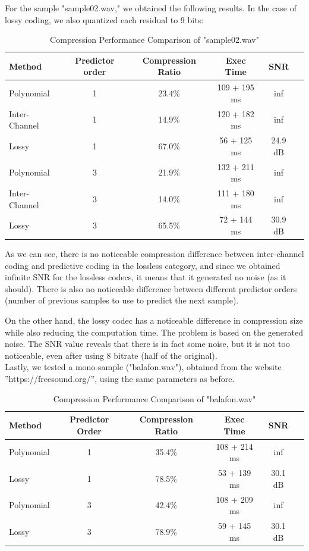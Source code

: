 \documentclass[a4paper,14pt]{article}
\begin{document}
For the sample "sample02.wav," we obtained the following results. In the case of lossy coding, we also quantized each residual to 9 bits: 
\begin{table}[H]
\centering
\begin{tabular}{|l|c|c|c|c|c|}
\hline
\textbf{Method} & \textbf{Predictor order} & \textbf{Compression Ratio} & \textbf{Exec Time} & \textbf{SNR}\\
\hline
Polynomial & 1 & 23.4\% & 109 + 195 ms & inf\\ 
Inter-Channel & 1 & 14.9\% & 120 + 182 ms & inf\\
Lossy & 1 & 67.0\% & 56 + 125 ms & 24.9 dB\\
\hline
Polynomial & 3 & 21.9\% & 132 + 211 ms & inf\\
Inter-Channel & 3 & 14.0\% & 111 + 180 ms & inf\\
Lossy & 3 & 65.5\% & 72 + 144 ms & 30.9 dB\\
\hline
\end{tabular}
\caption{Compression Performance Comparison of "sample02.wav"}
\end{table}



As we can see, there is no noticeable compression difference between inter-channel coding and predictive coding in the lossless category, and since we obtained infinite SNR for the lossless codecs, it means that it generated no noise (as it should). There is also no noticeable difference between different predictor orders (number of previous samples to use to predict the next sample).

On the other hand, the lossy codec has a noticeable difference in compression size while also reducing the computation time. The problem is based on the generated noise. The SNR value reveals that there is in fact some noise, but it is not too noticeable, even after using 8 bitrate (half of the original). \\



Lastly, we tested a mono-sample ("balafon.wav"), obtained from the website ”https://freesound.org/”, using the same parameters as before.
\begin{table}[H]
\centering
\begin{tabular}{|l|c|c|c|c|c|}
\hline
\textbf{Method} & \textbf{Predictor Order} &\textbf{Compression Ratio} & \textbf{Exec Time} & \textbf{SNR}\\
\hline
Polynomial & 1 & 35.4\% & 108 + 214 ms & inf\\ 
Lossy & 1 & 78.5\% & 53 + 139 ms & 30.1 dB\\
\hline
Polynomial & 3 & 42.4\% & 108 + 209 ms & inf\\ 
Lossy & 3 & 78.9\% & 59 + 145 ms & 30.1 dB\\
\hline
\end{tabular}
\caption{Compression Performance Comparison of "balafon.wav"}
\end{table}
\end{document}
